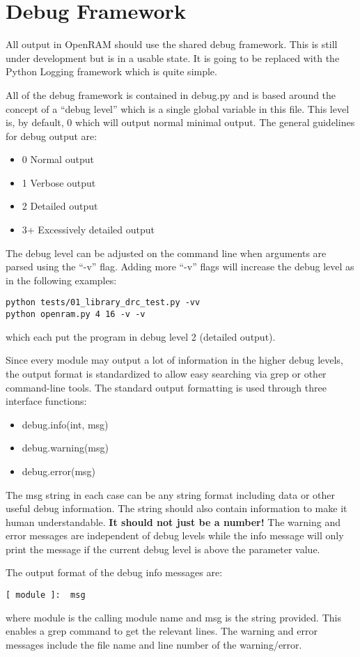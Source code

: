 \section{Debug Framework}
\label{sec:debug}

All output in OpenRAM should use the shared debug framework. This is
still under development but is in a usable state. It is going to be
replaced with the Python Logging framework which is quite simple.

All of the debug framework is contained in debug.py and is based
around the concept of a ``debug level'' which is a single global
variable in this file. This level is, by default, 0 which will output
normal minimal output. The general guidelines for debug output are:
\begin{itemize}
\item 0 Normal output
\item 1 Verbose output
\item 2 Detailed output
\item 3+ Excessively detailed output
\end{itemize}

The debug level can be adjusted on the command line when arguments are parsed using the ``-v'' flag. Adding more ``-v'' flags will increase the debug level as in the following examples:
\begin{verbatim}
python tests/01_library_drc_test.py -vv
python openram.py 4 16 -v -v
\end{verbatim}
which each put the program in debug level 2 (detailed output).

Since every module may output a lot of information in the higher debug
levels, the output format is standardized to allow easy searching via
grep or other command-line tools. The standard output formatting is
used through three interface functions: 
\begin{itemize}
\item debug.info(int, msg)
\item debug.warning(msg)
\item debug.error(msg)
\end{itemize}
The msg string in each case can be any string format including data or
other useful debug information. The string should also contain
information to make it human understandable. {\bf It should not just be
  a number!} The warning and error messages are independent of debug
levels while the info message will only print the message if the
current debug level is above the parameter value.

The output format of the debug info messages are:
\begin{verbatim}
[ module ]:  msg
\end{verbatim}
where module is the calling module name and msg is the string
provided. This enables a grep command to get the relevant lines.  The
warning and error messages include the file name and line number of
the warning/error.
